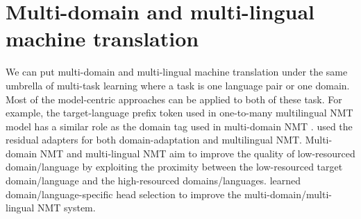 \section{Multi-domain and multi-lingual machine translation}
We can put multi-domain and multi-lingual machine translation under the same umbrella of multi-task learning where a task is one language pair or one domain. Most of the model-centric approaches can be applied to both of these task. For example, the target-language prefix token used in one-to-many multilingual NMT model \citep{Aharoni19massively,Johnson17google} has a similar role as the domain tag used in multi-domain NMT \citep{Kobus17domain}. \citet{Bapna19simple} used the residual adapters for both domain-adaptation and multilingual NMT. Multi-domain NMT and multi-lingual NMT aim to improve the quality of low-resourced domain/language by exploiting the proximity between the low-resourced target domain/language and the high-resourced domains/languages. \citet{Gong21Pay} learned domain/language-specific head selection to improve the multi-domain/multi-lingual NMT system.






































































